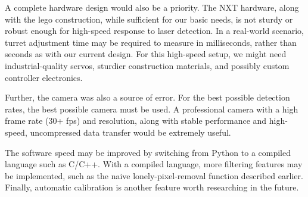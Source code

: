 \documentclass[10pt,twocolumn,letterpaper]{article}
\begin{document}
A complete hardware design would also be a priority.  The NXT hardware, along with the lego construction, while sufficient for our basic needs, is not sturdy or robust enough for high-speed response to laser detection.  In a real-world scenario, turret adjustment time may be required to measure in milliseconds, rather than seconds as with our current design.  For this high-speed setup, we might need industrial-quality servos, sturdier construction materials, and possibly custom controller electronics.

Further, the camera was also a source of error.  For the best possible detection rates, the best possible camera must be used.  A professional camera with a high frame rate (30+ fps) and resolution, along with stable performance and high-speed, uncompressed data transfer would be extremely useful.

The software speed may be improved by switching from Python to a compiled language such as C/C++.  With a compiled language, more filtering features may be implemented, such as the naive lonely-pixel-removal function described earlier.  Finally, automatic calibration is another feature worth researching in the future.

{\small


}
\end{document}
